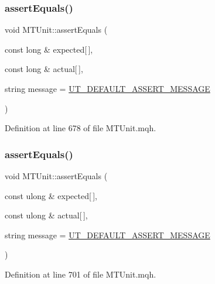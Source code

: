 \subsubsection{\texorpdfstring{assert\+Equals()}{assertEquals()}\hspace{0.1cm}{\footnotesize\ttfamily [22/28]}}
{\footnotesize\ttfamily void M\+T\+Unit\+::assert\+Equals (\begin{DoxyParamCaption}\item[{const long \&}]{expected\mbox{[}$\,$\mbox{]},  }\item[{const long \&}]{actual\mbox{[}$\,$\mbox{]},  }\item[{string}]{message = {\ttfamily \mbox{\hyperlink{_m_t_unit_8mqh_a96f5d62188d09039ebc3f443c9120e39}{U\+T\+\_\+\+D\+E\+F\+A\+U\+L\+T\+\_\+\+A\+S\+S\+E\+R\+T\+\_\+\+M\+E\+S\+S\+A\+GE}}} }\end{DoxyParamCaption})}



Definition at line 678 of file M\+T\+Unit.\+mqh.

\mbox{\label{class_m_t_unit_ad44c2240c937953188de4f94e6724528}} 
\subsubsection{\texorpdfstring{assert\+Equals()}{assertEquals()}\hspace{0.1cm}{\footnotesize\ttfamily [23/28]}}
{\footnotesize\ttfamily void M\+T\+Unit\+::assert\+Equals (\begin{DoxyParamCaption}\item[{const ulong \&}]{expected\mbox{[}$\,$\mbox{]},  }\item[{const ulong \&}]{actual\mbox{[}$\,$\mbox{]},  }\item[{string}]{message = {\ttfamily \mbox{\hyperlink{_m_t_unit_8mqh_a96f5d62188d09039ebc3f443c9120e39}{U\+T\+\_\+\+D\+E\+F\+A\+U\+L\+T\+\_\+\+A\+S\+S\+E\+R\+T\+\_\+\+M\+E\+S\+S\+A\+GE}}} }\end{DoxyParamCaption})}



Definition at line 701 of file M\+T\+Unit.\+mqh.

\mbox{\label{class_m_t_unit_ab15646b74a28153c94f48d85776abc79}} 
